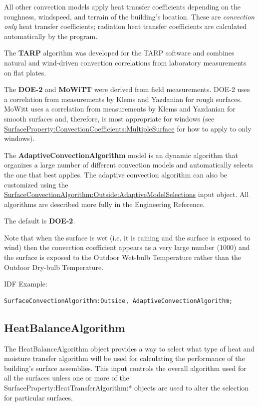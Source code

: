 All other convection models apply heat transfer coefficients depending on the roughness, windspeed, and terrain of the building's location. These are \emph{convection only} heat transfer coefficients; radiation heat transfer coefficients are calculated automatically by the program.

The \textbf{TARP} algorithm was developed for the TARP software and combines natural and wind-driven convection correlations from laboratory measurements on flat plates.

The \textbf{DOE-2} and \textbf{MoWiTT} were derived from field measurements. DOE-2 uses a correlation from measurements by Klems and Yazdanian for rough surfaces. MoWitt uses a correlation from measurements by Klems and Yazdanian for smooth surfaces and, therefore, is most appropriate for windows (see \hyperref[surfacepropertyconvectioncoefficientsmultiplesurface]{SurfaceProperty:ConvectionCoefficients:MultipleSurface} for how to apply to only windows).

The \textbf{AdaptiveConvectionAlgorithm} model is an dynamic algorithm that organizes a large number of different convection models and automatically selects the one that best applies. The adaptive convection algorithm can also be customized using the \hyperref[surfaceconvectionalgorithmoutsideadaptivemodelselections]{SurfaceConvectionAlgorithm:Outside:AdaptiveModelSelections} input object. All algorithms are described more fully in the Engineering Reference.

The default is \textbf{DOE-2}.

Note that when the surface is wet (i.e. it is raining and the surface is exposed to wind) then the convection coefficient appears as a very large number (1000) and the surface is exposed to the Outdoor Wet-bulb Temperature rather than the Outdoor Dry-bulb Temperature.

IDF Example:

\begin{lstlisting}
SurfaceConvectionAlgorithm:Outside, AdaptiveConvectionAlgorithm;
\end{lstlisting}

\subsection{HeatBalanceAlgorithm}\label{heatbalancealgorithm}

The HeatBalanceAlgorithm object provides a way to select what type of heat and moisture transfer algorithm will be used for calculating the performance of the building's surface assemblies. This input controls the overall algorithm used for all the surfaces unless one or more of the SurfaceProperty:HeatTransferAlgorithm:* objects are used to alter the selection for particular surfaces.

